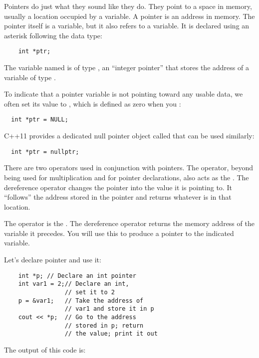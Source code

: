 Pointers do just what they sound like they do. 
They point to a space in memory, usually a location occupied by a variable. 
A pointer is an address in memory. 
The pointer itself is a variable, but it also refers to a variable. 
It is declared using an asterisk following the data type:

\begin{lstlisting}
	int *ptr; 
\end{lstlisting}

The variable named  is of type , an ``integer pointer'' that stores the address of a variable of type .

To indicate that a pointer variable is not pointing toward any usable data, we often set its value to , which is defined as zero when you :

\begin{lstlisting}
  int *ptr = NULL;
\end{lstlisting}

C++11 provides a dedicated null pointer object called  that can be used similarly:

\begin{lstlisting}
  int *ptr = nullptr;
\end{lstlisting}

There are two operators used in conjunction with pointers. 
The \Code{*} operator, beyond being used for multiplication and for pointer declarations, also acts as the . 
The dereference operator changes the pointer into the value it is pointing to.
It ``follows'' the address stored in the pointer and returns whatever is in that location.

The \Code{\&} operator is the . 
The dereference operator returns the memory address of the variable it precedes. 
You will use this to produce a pointer to the indicated variable.

Let's declare pointer  and use it:

\begin{lstlisting}
	int *p; // Declare an int pointer
	int var1 = 2;// Declare an int, 
	             // set it to 2
	p = &var1;   // Take the address of
	             // var1 and store it in p
	cout << *p;  // Go to the address 
	             // stored in p; return              
	             // the value; print it out
\end{lstlisting}

The output of this code is:

